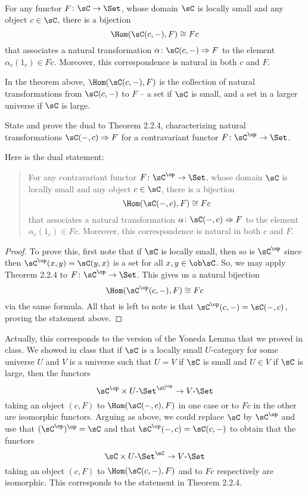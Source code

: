 \documentclass[main.tex]{subfiles}
\begin{document}
\paragraph{}
\begin{theorem}
For any functor $F\colon\sC\rightarrow\Set$, whose domain $\sC$ is locally small and any object $c\in\sC$, there is a bijection
\[\Hom(\sC(c,-),F)\cong Fc\]
that associates a natural transformation $\alpha\colon\sC(c,-)\Rightarrow F$ to the element $\alpha_c(1_c)\in Fc$. Moreover, this correspondence is natural in both $c$ and $F$.
\end{theorem}
\popthm

In the theorem above, $\Hom(\sC(c,-),F)$ is the collection of natural transformations from $\sC(c,-)$ to $F$ -- a set if $\sC$ is small, and a set in a larger universe if $\sC$ is large.

\begin{exercise}
State and prove the dual to Theorem 2.2.4, characterizing natural transformations $\sC(-,c)\Rightarrow F$ for a contravariant functor $F\colon\sC^\op\rightarrow\Set$.
\end{exercise}

Here is the dual statement:
\begin{quote}
For any contravariant functor $F\colon\sC^\op\rightarrow\Set$, whose domain $\sC$ is locally small and any object $c\in\sC$, there is a bijection
\[\Hom(\sC(-,c),F)\cong Fc\]
that associates a natural transformation $\alpha\colon\sC(-,c)\Rightarrow F$ to the element $\alpha_c(1_c)\in Fc$. Moreover, this correspondence is natural in both $c$ and $F$.
\end{quote}

\begin{proof}
To prove this, first note that if $\sC$ is locally small, then so is $\sC^\op$ since then $\sC^\op(x,y)=\sC(y,x)$ is a set for all $x,y\in\ob\sC$. So, we may apply Theorem 2.2.4 to $F\colon\sC^\op\rightarrow\Set$. This gives us a natural bijection 
\[\Hom(\sC^\op(c,-),F)\cong Fc\]
via the same formula. All that is left to note is that $\sC^\op(c,-)=\sC(-,c)$, proving the statement above.
\end{proof}

Actually, this corresponds to the version of the Yoneda Lemma that we proved in class. We showed in class that if $\sC$ is a locally small $U$-category for some universe $U$ and $V$ is a universe such that $U=V$ if $\sC$ is small and $U\in V$ if $\sC$ is large, then the functors
\[\sC^\op\times U\mbox{-}\Set^{\sC^\op}\rightarrow V\mbox{-}\Set\]
taking an object $(c,F)$ to $\Hom(\sC(-,c),F)$ in one case or to $Fc$ in the other are isomorphic functors. Arguing as above, we could replace $\sC$ by $\sC^\op$ and use that $(\sC^\op)^\op=\sC$ and that $\sC^\op(-,c)=\sC(c,-)$ to obtain that the functors
\[\sC\times U\mbox{-}\Set^\sC\rightarrow V\mbox{-}\Set\]
taking an object $(c,F)$ to $\Hom(\sC(c,-),F)$ and to $Fc$ respectively are isomorphic. This corresponds to the statement in Theorem 2.2.4.
\end{document}
